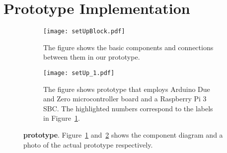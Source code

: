 \section{\name Prototype Implementation}
\label{sec:prototype}


\begin{figure}[t]
	\begin{center}
		\begin{subfigure}{0.4\textwidth}
		\centering
			\texttt{[image: setUpBlock.pdf]}
			\caption{The figure shows the basic components and connections between them in our \name prototype.}
			\label{fig:prototypeArch}	
		\end{subfigure}
	\end{center}
	
	
	\begin{center}
		\begin{subfigure}{0.4\textwidth}
		\centering
		\texttt{[image: setUp\_1.pdf]}
		\caption{The figure shows \name prototype that employs Arduino Due and Zero microcontroller board and a Raspberry Pi 3 SBC. The highlighted numbers correspond to the labels in Figure~\ref{fig:prototypeArch}.}
		\label{fig:prototype}
	\end{subfigure}
	\end{center}
	\vspace{-1em}
	
	\caption{\textbf{\name prototype}. Figure~\ref{fig:prototypeArch} and~\ref{fig:prototype} shows the component diagram and a photo of the actual \name prototype respectively.} 
	\label{fig:prototypeAll}
	\spacesave
\end{figure}


\iffalse
\begin{figure}[t]
\centering
\texttt{[image: setUpBlock.pdf]}
\caption{\textbf{\name prototype architecture}. }
\label{fig:prototypeArch}
\centering
\end{figure}


\begin{figure}[t]
\centering
\texttt{[image: setUp\_1.pdf]}
\caption{\textbf{\name prototype}. The figure shows \name prototype that employs Arduino Due and Zero microcontroller board and a Raspberry Pi 3 SBC. The highlighted numbers correspond to the labels in Figure~\ref{fig:prototypeArch}.}
\spacesave
\label{fig:prototype}
\centering
\end{figure}
\fi


